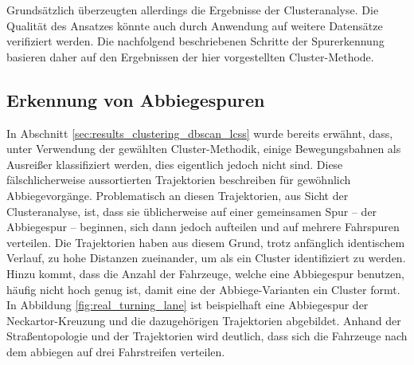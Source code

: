 Grundsätzlich überzeugten allerdings die Ergebnisse der Clusteranalyse. Die Qualität des Ansatzes könnte auch
durch Anwendung auf weitere Datensätze verifiziert werden. Die nachfolgend beschriebenen Schritte der Spurerkennung
basieren daher auf den Ergebnissen der hier vorgestellten Cluster-Methode.

\subsection{Erkennung von Abbiegespuren}
\label{sec:real_detect_turning_lane}

In Abschnitt \ref{sec:results_clustering_dbscan_lcss} wurde bereits erwähnt, dass, unter Verwendung der
gewählten Cluster-Methodik, einige Bewegungsbahnen als Ausreißer klassifiziert werden, dies eigentlich jedoch
nicht sind. Diese fälschlicherweise aussortierten Trajektorien beschreiben für gewöhnlich Abbiegevorgänge.
Problematisch an diesen Trajektorien, aus Sicht der Clusteranalyse, ist, dass sie üblicherweise auf einer
gemeinsamen Spur -- der Abbiegespur -- beginnen, sich dann jedoch aufteilen und auf mehrere Fahrspuren verteilen.
Die Trajektorien haben aus diesem Grund, trotz anfänglich identischem Verlauf, zu hohe Distanzen zueinander, um
als ein Cluster identifiziert zu werden. Hinzu kommt, dass die Anzahl der Fahrzeuge, welche eine Abbiegespur
benutzen, häufig nicht hoch genug ist, damit eine der Abbiege-Varianten ein Cluster formt. 
In Abbildung \ref{fig:real_turning_lane} ist beispielhaft eine Abbiegespur der Neckartor-Kreuzung und
die dazugehörigen Trajektorien abgebildet. Anhand der Straßentopologie und der Trajektorien wird deutlich,
dass sich die Fahrzeuge nach dem abbiegen auf drei Fahrstreifen verteilen.

